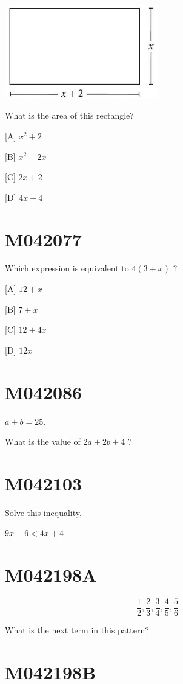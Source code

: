 \documentclass[12pt]{article}
\begin{document}
\includegraphics[max width=0.5\textwidth]{2024_02_20_828ebc9d68bcc1fbb223g-36}

What is the area of this rectangle?

[A] $x^{2}+2$

[B] $x^{2}+2 x$

[C] $2 x+2$

[D] $4 x+4$

\newpage
\section*{M042077}

Which expression is equivalent to $4(3+x)$ ?

[A] $12+x$

[B] $7+x$

[C] $12+4 x$

[D] $12 x$

\newpage
\section*{M042086}
$a+b=25$.

What is the value of $2 a+2 b+4$ ?

\newpage
\section*{M042103}

Solve this inequality.

$9 x-6<4 x+4$

\newpage
\section*{M042198A}

$$
\frac{1}{2}, \frac{2}{3}, \frac{3}{4}, \frac{4}{5}, \frac{5}{6}
$$

What is the next term in this pattern?

\newpage
\section*{M042198B}
\end{document}
